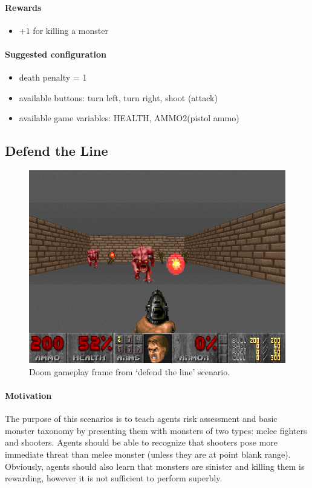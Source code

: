 \documentclass[english,bachelor,a4paper,twoside]{ppfcmthesis}
\begin{document}
		\paragraph{Rewards}
			\begin{itemize}
				\item $+1$ for killing a monster
			\end{itemize}
		
		\paragraph{Suggested configuration}
			\begin{itemize}
				\item death penalty = 1
				\item available buttons: turn left, turn right, shoot (attack)
				\item available game variables: HEALTH, AMMO2(pistol ammo)
			\end{itemize}
	\newpage

	\subsection{Defend the Line}
		\begin{figure}
			\centering
			\includegraphics[scale=0.5]{defend_the_line.png}
			\caption{Doom gameplay frame from `defend the line' scenario.}\label{fig:defend_the_line}
		\end{figure}
		\paragraph{Motivation} 
			The purpose of this scenarios is to teach agents risk assessment and basic monster taxonomy by presenting them with monsters of two types: melee fighters and shooters. Agents should be able to recognize that shooters pose more immediate threat than melee monster (unless they are at point blank range). Obviously, agents should also learn that monsters are sinister and killing them is rewarding, however it is not sufficient to perform superbly.
\end{document}

